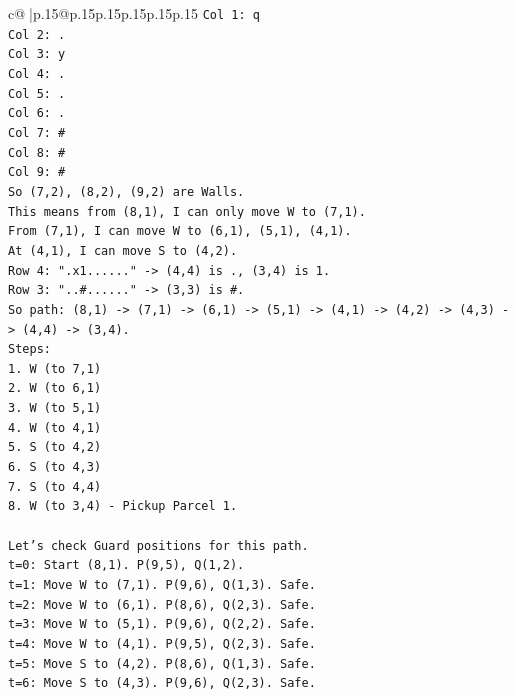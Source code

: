 \documentclass{article}
\begin{document}
{\begin{supertabular}{c@{$\;$}|p{.15\linewidth}@{}p{.15\linewidth}p{.15\linewidth}p{.15\linewidth}p{.15\linewidth}p{.15\linewidth}}
{{{\texttt{Col 1: q} \\
\texttt{Col 2: .} \\
\texttt{Col 3: y} \\
\texttt{Col 4: .} \\
\texttt{Col 5: .} \\
\texttt{Col 6: .} \\
\texttt{Col 7: \#} \\
\texttt{Col 8: \#} \\
\texttt{Col 9: \#} \\
\texttt{So (7,2), (8,2), (9,2) are Walls.} \\
\texttt{This means from (8,1), I can only move W to (7,1).} \\
\texttt{From (7,1), I can move W to (6,1), (5,1), (4,1).} \\
\texttt{At (4,1), I can move S to (4,2).} \\
\texttt{Row 4: ".x1......" {-}> (4,4) is ., (3,4) is 1.} \\
\texttt{Row 3: "..\#......" {-}> (3,3) is \#.} \\
\texttt{So path: (8,1) {-}> (7,1) {-}> (6,1) {-}> (5,1) {-}> (4,1) {-}> (4,2) {-}> (4,3) {-}> (4,4) {-}> (3,4).} \\
\texttt{Steps:} \\
\texttt{1. W (to 7,1)} \\
\texttt{2. W (to 6,1)} \\
\texttt{3. W (to 5,1)} \\
\texttt{4. W (to 4,1)} \\
\texttt{5. S (to 4,2)} \\
\texttt{6. S (to 4,3)} \\
\texttt{7. S (to 4,4)} \\
\texttt{8. W (to 3,4) {-} Pickup Parcel 1.} \\
\\ 
\texttt{Let's check Guard positions for this path.} \\
\texttt{t=0: Start (8,1). P(9,5), Q(1,2).} \\
\texttt{t=1: Move W to (7,1). P(9,6), Q(1,3). Safe.} \\
\texttt{t=2: Move W to (6,1). P(8,6), Q(2,3). Safe.} \\
\texttt{t=3: Move W to (5,1). P(9,6), Q(2,2). Safe.} \\
\texttt{t=4: Move W to (4,1). P(9,5), Q(2,3). Safe.} \\
\texttt{t=5: Move S to (4,2). P(8,6), Q(1,3). Safe.} \\
\texttt{t=6: Move S to (4,3). P(9,6), Q(2,3). Safe.} \\
}}}
\end{supertabular}}
\end{document}
